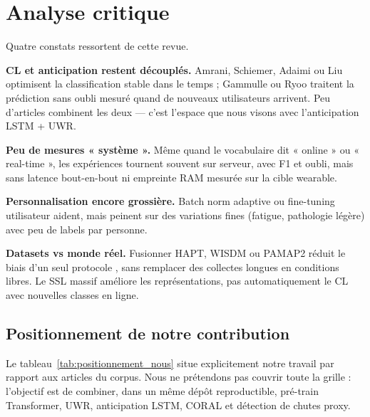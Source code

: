 \documentclass[a4paper,12pt]{report}
\begin{document}
\section{Analyse critique}

Quatre constats ressortent de cette revue.

\textbf{CL et anticipation restent découplés.} Amrani, Schiemer, Adaimi ou Liu
optimisent la classification stable dans le temps ; Gammulle ou Ryoo traitent la
prédiction sans oubli mesuré quand de nouveaux utilisateurs arrivent. Peu
d'articles combinent les deux — c'est l'espace que nous visons avec l'anticipation
LSTM + UWR.

\textbf{Peu de mesures « système ».} Même quand le vocabulaire dit « online » ou
« real-time », les expériences tournent souvent sur serveur, avec F1 et oubli, mais
sans latence bout-en-bout ni empreinte RAM mesurée sur la cible wearable.

\textbf{Personnalisation encore grossière.} Batch norm adaptive ou fine-tuning
utilisateur aident, mais peinent sur des variations fines (fatigue, pathologie
légère) avec peu de labels par personne.

\textbf{Datasets vs monde réel.} Fusionner HAPT, WISDM ou PAMAP2 réduit le biais
d'un seul protocole \parencite{amrani2025}, sans remplacer des collectes longues
en conditions libres. Le SSL massif \parencite{yuan2024} améliore les
représentations, pas automatiquement le CL avec nouvelles classes en ligne.

\subsection{Positionnement de notre contribution}

Le tableau~\ref{tab:positionnement_nous} situe explicitement notre travail par
rapport aux articles du corpus. Nous ne prétendons pas couvrir toute la grille :
l'objectif est de combiner, dans un même dépôt reproductible, pré-train Transformer,
UWR, anticipation LSTM, CORAL et détection de chutes proxy.
\end{document}
